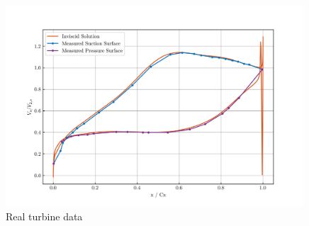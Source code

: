 \documentclass{article}
\begin{document}

\begin{figure}[H]
    \centering
    \includegraphics[width=0.99\textwidth]{figures/turbine_real.png}
    \caption{Real turbine data \cite{4A3_lab}}
    \label{fig:turbine_real}
\end{figure}
\end{document}
